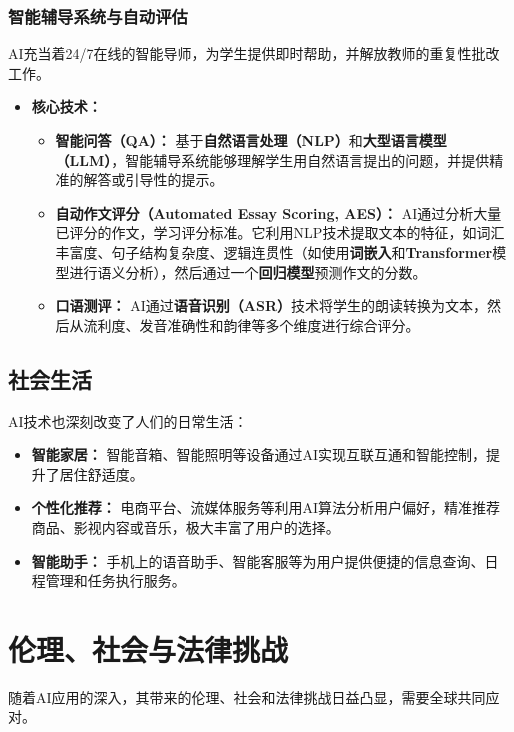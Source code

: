 \begin{itemize}
    \subsubsection{智能辅导系统与自动评估}
    AI充当着24/7在线的智能导师，为学生提供即时帮助，并解放教师的重复性批改工作。
    \begin{itemize}
        \item \textbf{核心技术：}
            \begin{itemize}
                \item \textbf{智能问答（QA）：} 基于\textbf{自然语言处理（NLP）}和\textbf{大型语言模型（LLM）}，智能辅导系统能够理解学生用自然语言提出的问题，并提供精准的解答或引导性的提示。
                \item \textbf{自动作文评分（Automated Essay Scoring, AES）：} AI通过分析大量已评分的作文，学习评分标准。它利用NLP技术提取文本的特征，如词汇丰富度、句子结构复杂度、逻辑连贯性（如使用\textbf{词嵌入}和\textbf{Transformer}模型进行语义分析），然后通过一个\textbf{回归模型}预测作文的分数。
                \item \textbf{口语测评：} AI通过\textbf{语音识别（ASR）}技术将学生的朗读转换为文本，然后从流利度、发音准确性和韵律等多个维度进行综合评分。
            \end{itemize}
    \end{itemize}
\end{itemize}

\subsection{社会生活}
AI技术也深刻改变了人们的日常生活：
\begin{itemize}
    \item \textbf{智能家居：} 智能音箱、智能照明等设备通过AI实现互联互通和智能控制，提升了居住舒适度。
    \item \textbf{个性化推荐：} 电商平台、流媒体服务等利用AI算法分析用户偏好，精准推荐商品、影视内容或音乐，极大丰富了用户的选择。
    \item \textbf{智能助手：} 手机上的语音助手、智能客服等为用户提供便捷的信息查询、日程管理和任务执行服务。
\end{itemize}

\section{伦理、社会与法律挑战}

随着AI应用的深入，其带来的伦理、社会和法律挑战日益凸显，需要全球共同应对。

